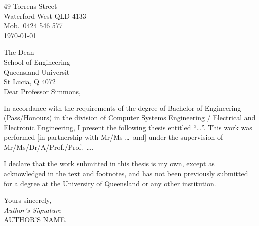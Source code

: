 \begin{flushright}
	49 Torrens Street\\
	Waterford West QLD 4133\\
	Mob.\ 0424 546 577\\
	\medskip
	\today
\end{flushright}
\begin{flushleft}
  The Dean\\
  School of Engineering\\
  Queensland Universit\\
  St Lucia, Q 4072\\
  \bigskip\bigskip
  Dear Professor Simmons,
\end{flushleft}

In accordance with the requirements of the degree of Bachelor of
Engineering (Pass/Honours) in the division of Computer Systems
Engineering / Electrical and Electronic Engineering, I present the
following thesis entitled ``\ldots''.  This work was performed [in
partnership with Mr/Ms \ldots\ and] under the supervision of
Mr/Ms/Dr/A/Prof./Prof.~\ldots.

I declare that the work submitted in this thesis is my own, except as
acknowledged in the text and footnotes, and has not been previously
submitted for a degree at the University of Queensland or any other
institution.

\begin{flushright}
	Yours sincerely,\\
	\medskip
	\emph{Author's Signature}\\
	\medskip
	AUTHOR'S NAME.
\end{flushright}